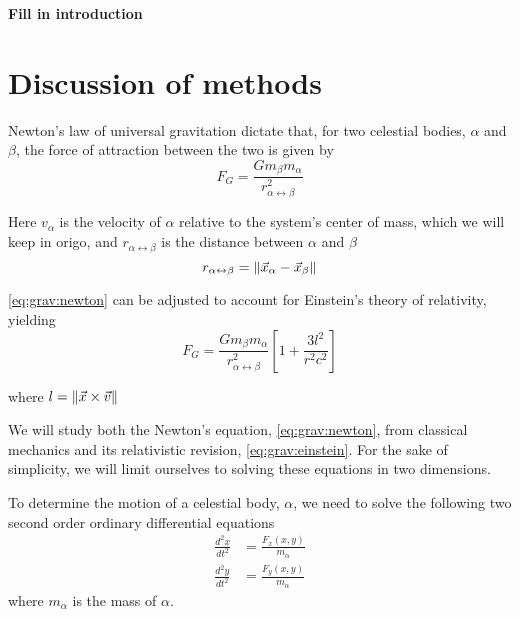 \documentclass[a4paper]{article}
\begin{document}
\textbf{Fill in introduction}




\section{Discussion of methods}\label{sec:methods}
Newton's law of universal gravitation dictate that, for two celestial bodies, $\alpha$ and $\beta$, the force of attraction between the two is given by
\begin{equation}
F_G
=\frac{Gm_{\beta}m_{\alpha}}{r_{\alpha \leftrightarrow \beta}^2}
\label{eq:grav:newton}
\end{equation}


Here $v_{\alpha}$ is the velocity of $\alpha$ relative to the system's center of mass, which we will keep in origo, and $r_{\alpha \leftrightarrow \beta}$ is the distance between $\alpha$ and $\beta$
\begin{equation}
r_{\alpha \leftrightarrow \beta} = \norm{ \vec{x}_{\alpha} - \vec{x}_{\beta} }
\end{equation}

\eqref{eq:grav:newton} can be adjusted to account for Einstein's theory of relativity, yielding
\begin{equation}
F_G
=\frac{Gm_{\beta}m_{\alpha}}{r_{\alpha \leftrightarrow \beta}^2}
\left[1 + \frac{3l^2}{r^2c^2}\right]
\label{eq:grav:einstein}
\end{equation}

where $l = \norm{\vec{x} \times \vec{v}}$

We will study both the Newton's equation, \eqref{eq:grav:newton}, from classical mechanics and its relativistic revision, \eqref{eq:grav:einstein}. For the sake of simplicity, we will limit ourselves to solving these equations in two dimensions.



To determine the motion of a celestial body, $\alpha$, we need to solve the following two second order ordinary differential equations
\begin{align}
\frac{d^2x}{dt^2} &= \frac{F_x(x,y)}{m_{\alpha}} \label{eq:acc:x}\\
\frac{d^2y}{dt^2} &= \frac{F_y(x,y)}{m_{\alpha}} \label{eq:acc:y}
\end{align}
where $m_{\alpha}$ is the mass of $\alpha$.\\
\end{document}
